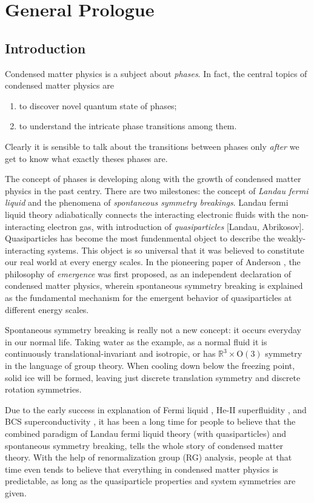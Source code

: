 \section{General Prologue}
    \subsection{Introduction}
        Condensed matter physics is a subject about \emph{phases}. In fact, the central topics of condensed matter physics are
        \begin{enumerate}
            \item to discover novel quantum state of phases;
            \item to understand the intricate phase transitions among them.
        \end{enumerate}
        Clearly it is sensible to talk about the transitions between phases only \emph{after} we get to know what exactly theses phases are.
        
        The concept of phases is developing along with the growth of condensed matter physics in the past centry. There are two milestones: the concept of \emph{Landau fermi liquid} and the phenomena of \emph{spontaneous symmetry breakings}. Landau fermi liquid theory adiabatically connects the interacting electronic fluids with the non-interacting electron gas, with introduction of \emph{quasiparticles} [Landau, Abrikosov]. Quasiparticles has become the most fundenmental object to describe the weakly-interacting systems. This object is so universal that it was believed to constitute our real world at every energy scales. In the pioneering paper of Anderson \cite{anderson1972more}, the philosophy of \emph{emergence} was first proposed, as an independent declaration of condensed matter physics, wherein spontaneous symmetry breaking is explained as the fundamental mechanism for the emergent behavior of quasiparticles at different energy scales.

        Spontaneous symmetry breaking is really not a new concept: it occurs everyday in our normal life. Taking water as the example, as a normal fluid it is continuously translational-invariant and isotropic, or has $\mathbb R^3\times\mathrm{O}(3)$ symmetry in the language of group theory. When cooling down below the freezing point, solid ice will be formed, leaving just discrete translation symmetry and discrete rotation symmetries.


        Due to the early success in explanation of Fermi liquid \cite{landau1959theory}, He-II superfluidity \cite{landau1941theory}, and BCS superconductivity \cite{bardeen1957theory}\cite{bardeen1957microscopic}, it has been a long time for people to believe that the combined paradigm of Landau fermi liquid theory (with quasiparticles) and spontaneous symmetry breaking, tells the whole story of condensed matter theory. With the help of renormalization group (RG) analysis, people at that time even tends to believe that everything in condensed matter physics is predictable, as long as the quasiparticle properties and system symmetries are given.

